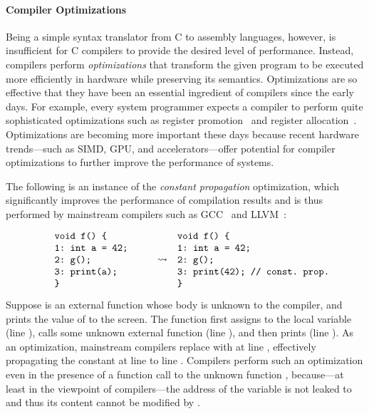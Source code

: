 \paragraph{Compiler Optimizations}

Being a simple syntax translator from C to assembly languages, however, is insufficient for C
compilers to provide the desired level of performance.  Instead, compilers perform
\emph{optimizations} that transform the given program to be executed more efficiently in hardware
while preserving its semantics.  Optimizations are so effective that they have been an essential
ingredient of compilers since the early days.  For example, every system programmer expects a
compiler to perform quite sophisticated optimizations such as register promotion~\cite{mem2reg} and
register allocation~\cite{regalloc}.  Optimizations are becoming more important these days because
recent hardware trends---such as SIMD, GPU, and accelerators---offer potential for compiler
optimizations to further improve the performance of systems.

The following is an instance of the \emph{constant propagation} optimization, which significantly
improves the performance of compilation results and is thus performed by mainstream compilers such
as GCC~\cite{gcc} and LLVM~\cite{llvm}:

%
\[\begin{array}{rcl}
\begin{minipage}{0.27\textwidth}
\begin{verbatim}
void f() {
1: int a = 42;
2: g();
3: print(a);
}
\end{verbatim}
\end{minipage}
&
\optarrow
&
\begin{minipage}{0.4\textwidth}
\begin{verbatim}
void f() {
1: int a = 42;
2: g();
3: print(42); // const. prop.
}
\end{verbatim}
\end{minipage}
\end{array}\]

\noindent Suppose  is an external function whose body is unknown to the compiler, and
 prints the value of  to the screen.  The function  first assigns
 to the local variable  (line ), calls some unknown external function
 (line ), and then prints  (line ).  As an optimization,
mainstream compilers replace  with  at line , effectively propagating the
constant  at line  to line .  Compilers perform such an optimization even
in the presence of a function call to the unknown function , because---at least in the
viewpoint of compilers---the address of the variable  is not leaked to  and thus
its content cannot be modified by .

